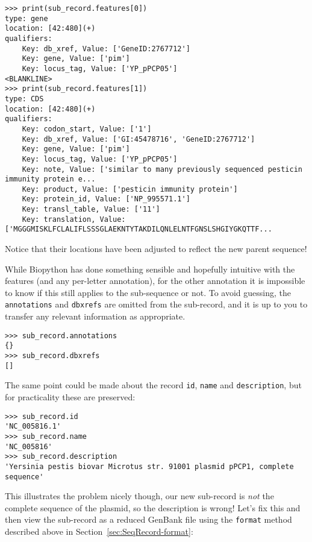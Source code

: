 \begin{verbatim}
>>> print(sub_record.features[0])
type: gene
location: [42:480](+)
qualifiers:
    Key: db_xref, Value: ['GeneID:2767712']
    Key: gene, Value: ['pim']
    Key: locus_tag, Value: ['YP_pPCP05']
<BLANKLINE>
>>> print(sub_record.features[1])
type: CDS
location: [42:480](+)
qualifiers:
    Key: codon_start, Value: ['1']
    Key: db_xref, Value: ['GI:45478716', 'GeneID:2767712']
    Key: gene, Value: ['pim']
    Key: locus_tag, Value: ['YP_pPCP05']
    Key: note, Value: ['similar to many previously sequenced pesticin immunity protein e...
    Key: product, Value: ['pesticin immunity protein']
    Key: protein_id, Value: ['NP_995571.1']
    Key: transl_table, Value: ['11']
    Key: translation, Value: ['MGGGMISKLFCLALIFLSSSGLAEKNTYTAKDILQNLELNTFGNSLSHGIYGKQTTF...
\end{verbatim}

\noindent Notice that their locations have been adjusted to reflect the new parent sequence!

While Biopython has done something sensible and hopefully intuitive with the features
(and any per-letter annotation), for the other annotation it is impossible to know if
this still applies to the sub-sequence or not. To avoid guessing, the \texttt{annotations}
and \texttt{dbxrefs} are omitted from the sub-record, and it is up to you to transfer
any relevant information as appropriate.

\begin{verbatim}
>>> sub_record.annotations
{}
>>> sub_record.dbxrefs
[]
\end{verbatim}

The same point could be made about the record \texttt{id}, \texttt{name}
and \texttt{description}, but for practicality these are preserved:

\begin{verbatim}
>>> sub_record.id
'NC_005816.1'
>>> sub_record.name
'NC_005816'
>>> sub_record.description
'Yersinia pestis biovar Microtus str. 91001 plasmid pPCP1, complete sequence'
\end{verbatim}

\noindent This illustrates the problem nicely though, our new sub-record is
\emph{not} the complete sequence of the plasmid, so the description is wrong!
Let's fix this and then view the sub-record as a reduced GenBank file using
the \texttt{format} method described above in Section~\ref{sec:SeqRecord-format}:

